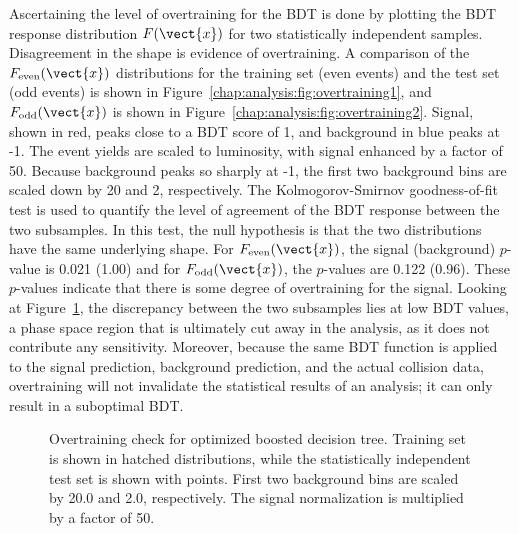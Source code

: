 Ascertaining the level of overtraining for the BDT is done by plotting
the BDT response distribution $F(\vect{x})$ for two statistically
independent samples. Disagreement in the shape is evidence of
overtraining. A comparison of the $F_{\textrm{even}}(\vect{x})$ distributions for the
training set (even events) and the test set (odd events) is
shown in Figure~\ref{chap:analysis:fig:overtraining1}, and
$F_{\textrm{odd}}(\vect{x})$ is shown in
Figure~\ref{chap:analysis:fig:overtraining2}. Signal, shown
in red, peaks close to a BDT score of 1, and background in blue peaks
at -1. The event yields are scaled to luminosity, with signal enhanced
by a factor of 50. Because background peaks so sharply at -1, the
first two background bins are scaled down by 20 and 2,
respectively. The Kolmogorov-Smirnov goodness-of-fit test is used to
quantify the level of agreement of the BDT response between the two
subsamples. In this test, the null hypothesis is that the two
distributions have the same underlying shape. For $F_{\textrm{even}}(\vect{x})$, the signal
(background) $p$-value is 0.021 (1.00) and for $F_{\textrm{odd}}(\vect{x})$, the $p$-values
are 0.122 (0.96). These $p$-values indicate that there is some degree
of overtraining for the signal. Looking at
Figure~\ref{chap:analysis:fig:overtraining}, the discrepancy
between the two subsamples lies at low BDT values, a phase space
region that is ultimately cut away in the analysis, as it does not
contribute any sensitivity. Moreover, because the
same BDT function is applied to the signal prediction, background
prediction, and the actual collision data, overtraining will not
invalidate the statistical results of an analysis; it can only result
in a suboptimal BDT.

\begin{figure}[h]
    \centering
    \caption[Boosted decision tree overtraining check.]{Overtraining
      check for optimized boosted decision tree. Training set is shown
    in hatched distributions, while the statistically independent test set
    is shown with points. First two background bins are scaled by 20.0
    and 2.0, respectively. The signal normalization is multiplied by a factor
    of 50.}
\label{chap:analysis:fig:overtraining}
\end{figure}

